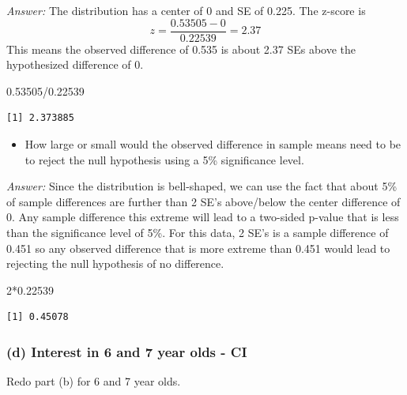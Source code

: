 \documentclass[
]{book}
\newenvironment{Shaded}{\begin{snugshade}}{\end{snugshade}}
\newcommand{\DecValTok}[1]{\textcolor[rgb]{0.00,0.00,0.81}{#1}}
\newcommand{\FloatTok}[1]{\textcolor[rgb]{0.00,0.00,0.81}{#1}}
\newcommand{\SpecialCharTok}[1]{\textcolor[rgb]{0.00,0.00,0.00}{#1}}
\providecommand{\tightlist}{%
  \setlength{\itemsep}{0pt}\setlength{\parskip}{0pt}}
\begin{document}
\emph{Answer:} The distribution has a center of 0 and SE of 0.225. The z-score is
\[
z = \dfrac{0.53505 - 0}{0.22539 } = 2.37
\]
This means the observed difference of 0.535 is about 2.37 SEs above the hypothesized difference of 0.

\begin{Shaded}
\begin{Highlighting}[]
\FloatTok{0.53505}\SpecialCharTok{/}\FloatTok{0.22539} 
\end{Highlighting}
\end{Shaded}

\begin{verbatim}
[1] 2.373885
\end{verbatim}

\begin{itemize}
\tightlist
\item
  How large or small would the observed difference in sample means need to be to reject the null hypothesis using a 5\% significance level.
\end{itemize}

\emph{Answer:} Since the distribution is bell-shaped, we can use the fact that about 5\% of sample differences are further than 2 SE's above/below the center difference of 0. Any sample difference this extreme will lead to a two-sided p-value that is less than the significance level of 5\%. For this data, 2 SE's is a sample difference of 0.451 so any observed difference that is more extreme than 0.451 would lead to rejecting the null hypothesis of no difference.

\begin{Shaded}
\begin{Highlighting}[]
\DecValTok{2}\SpecialCharTok{*}\FloatTok{0.22539} 
\end{Highlighting}
\end{Shaded}

\begin{verbatim}
[1] 0.45078
\end{verbatim}

\vspace*{.5in}

\hypertarget{d-interest-in-6-and-7-year-olds---ci}{%
\subsubsection{(d) Interest in 6 and 7 year olds - CI}\label{d-interest-in-6-and-7-year-olds---ci}}

Redo part (b) for 6 and 7 year olds.
\end{document}
